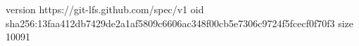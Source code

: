 version https://git-lfs.github.com/spec/v1
oid sha256:13faa412db7429de2a1af5809c6606ac348f00cb5e7306c9724f5fcecf0f70f3
size 10091
